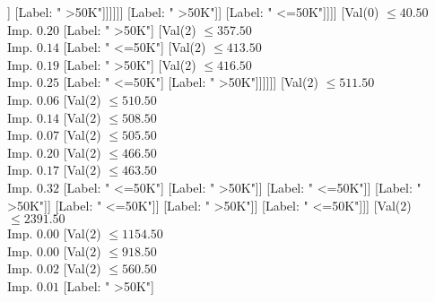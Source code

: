 \documentclass[margin=10pt]{standalone}
\begin{document}
\begin{forest}
																													[Val($2$) $ \leq 249.50$ \\ Imp. $0.07$
																														[Label: " <=50K"]
																														[Val($2$) $ \leq 295.50$ \\ Imp. $0.03$
																															[Val($2$) $ \leq 286.50$ \\ Imp. $0.24$
																																[Label: " >50K"]
																																[Label: " <=50K"]]
																															[Label: " >50K"]]]]]]
																										[Label: " >50K"]]
																									[Label: " <=50K"]]]]
																						[Val($0$) $ \leq 40.50$ \\ Imp. $0.20$
																							[Label: " >50K"]
																							[Val($2$) $ \leq 357.50$ \\ Imp. $0.14$
																								[Label: " <=50K"]
																								[Val($2$) $ \leq 413.50$ \\ Imp. $0.19$
																									[Label: " >50K"]
																									[Val($2$) $ \leq 416.50$ \\ Imp. $0.25$
																										[Label: " <=50K"]
																										[Label: " >50K"]]]]]]
																					[Val($2$) $ \leq 511.50$ \\ Imp. $0.06$
																						[Val($2$) $ \leq 510.50$ \\ Imp. $0.14$
																							[Val($2$) $ \leq 508.50$ \\ Imp. $0.07$
																								[Val($2$) $ \leq 505.50$ \\ Imp. $0.20$
																									[Val($2$) $ \leq 466.50$ \\ Imp. $0.17$
																										[Val($2$) $ \leq 463.50$ \\ Imp. $0.32$
																											[Label: " <=50K"]
																											[Label: " >50K"]]
																										[Label: " <=50K"]]
																									[Label: " >50K"]]
																								[Label: " <=50K"]]
																							[Label: " >50K"]]
																						[Label: " <=50K"]]]
																				[Val($2$) $ \leq 2391.50$ \\ Imp. $0.00$
																					[Val($2$) $ \leq 1154.50$ \\ Imp. $0.00$
																						[Val($2$) $ \leq 918.50$ \\ Imp. $0.02$
																							[Val($2$) $ \leq 560.50$ \\ Imp. $0.01$
																								[Label: " >50K"]

\end{forest}
\end{document}
